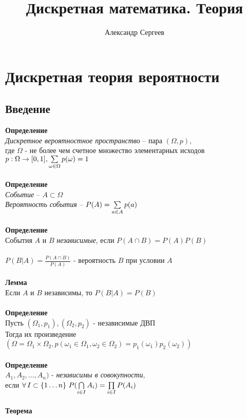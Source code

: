 \documentclass[12pt]{article}
\title{Дискретная математика. Теория}
\author{Александр Сергеев}
\date{}
\begin{document}
\maketitle
\section{Дискретная теория вероятности}
\subsection{Введение}
\textbf{Определение}\\
\textit{Дискретное вероятностное пространство} -- пара $(\Omega, p)$,\\
где $\Omega$ - не более чем счетное множество элементарных исходов\\
$p: \Omega \rightarrow [0, 1], \sum\limits_{\omega \in \Omega} p(\omega) = 1$\\\\
\textbf{Определение}\\
\textit{Событие} -- $A \subset \Omega$\\
\textit{Вероятность события} -- $P(A) = \sum\limits_{a \in A} p(a)$\\\\
\textbf{Определение}\\
События $A$ и $B$ \textit{независимые}, если $P(A \cap B) = P(A)P(B)$\\\\
$P(B|A) = \frac{P(A \cap B)}{P(A)}$ - вероятность $B$ при условии $A$\\\\
\textbf{Лемма}\\
Если $A$ и $B$ независимы, то $P(B|A) = P(B)$\\\\
\textbf{Определение}\\
Пусть $(\Omega_1, p_1), (\Omega_2, p_2)$ - независимые ДВП\\
Тогда их произведение $(\Omega = \Omega_1 \times \Omega_2, p(\omega_1 \in \Omega_1, \omega_2 \in \Omega_2) = p_1(\omega_1)p_2(\omega_2))$\\\\
\textbf{Определение}\\
$A_1, A_2, \ldots, A_n)$ - \textit{независимы в совокупности},\\
если $\fall I \subset \{1\ldots n\}\ P(\bigcapl_{i\in I} A_i) = \prodl_{i\in I}P(A_i)$\\\\
\textbf{Теорема}\\
\end{document}
